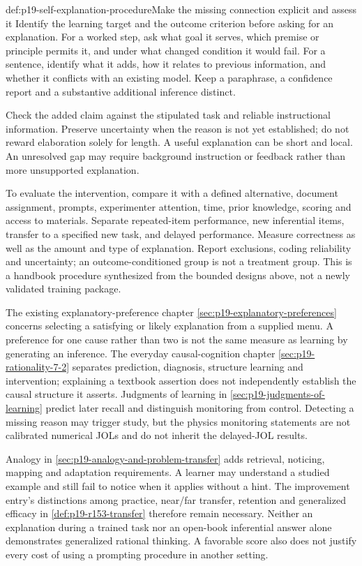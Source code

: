 \begin{hbmethod}{def:p19-self-explanation-procedure}{Make the missing connection explicit and assess it}
Identify the learning target and the outcome criterion before asking for an
explanation. For a worked step, ask what goal it serves, which premise or
principle permits it, and under what changed condition it would fail. For a
sentence, identify what it adds, how it relates to previous information,
and whether it conflicts with an existing model. Keep a paraphrase, a
confidence report and a substantive additional inference distinct.

Check the added claim against the stipulated task and reliable instructional
information. Preserve uncertainty when the reason is not yet established;
do not reward elaboration solely for length. A useful explanation can be
short and local. An unresolved gap may require background instruction or
feedback rather than more unsupported explanation.

To evaluate the intervention, compare it with a defined alternative,
document assignment, prompts, experimenter attention, time, prior knowledge,
scoring and access to materials. Separate repeated-item performance, new
inferential items, transfer to a specified new task, and delayed performance.
Measure correctness as well as the amount and type of explanation. Report
exclusions, coding reliability and uncertainty; an outcome-conditioned group
is not a treatment group. This is a handbook procedure synthesized from the
bounded designs above, not a newly validated training package.
\end{hbmethod}

The existing explanatory-preference chapter
\cref{sec:p19-explanatory-preferences} concerns selecting a satisfying or
likely explanation from a supplied menu. A preference for one cause rather
than two is not the same measure as learning by generating an inference.
The everyday causal-cognition chapter
\cref{sec:p19-rationality-7-2} separates prediction, diagnosis, structure
learning and intervention; explaining a textbook assertion does not
independently establish the causal structure it asserts. Judgments of
learning in \cref{sec:p19-judgments-of-learning} predict later recall and
distinguish monitoring from control. Detecting a missing reason may trigger
study, but the physics monitoring statements are not calibrated numerical
JOLs and do not inherit the delayed-JOL results.

Analogy in \cref{sec:p19-analogy-and-problem-transfer} adds retrieval,
noticing, mapping and adaptation requirements. A learner may understand a
studied example and still fail to notice when it applies without a hint.
The improvement entry's distinctions among practice, near/far transfer,
retention and generalized efficacy in \cref{def:p19-r153-transfer}
therefore remain necessary. Neither an explanation during a trained task
nor an open-book inferential answer alone demonstrates generalized rational
thinking. A favorable score also does not justify every cost of using a
prompting procedure in another setting.

